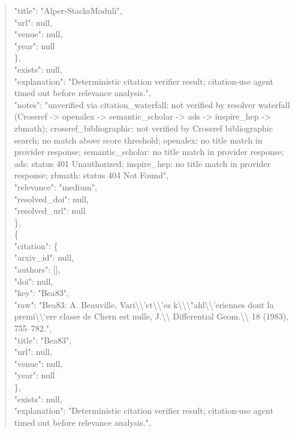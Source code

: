 \documentclass[11pt]{article}
\begin{document}
\begin{quote}
        "title": "Alper-StacksModuli",\\
        "url": null,\\
        "venue": null,\\
        "year": null\\
      \},\\
      "exists": null,\\
      "explanation": "Deterministic citation verifier result; citation-use agent timed out before relevance analysis.",\\
      "notes": "unverified via citation\_waterfall: not verified by resolver waterfall (Crossref -> openalex -> semantic\_scholar -> ads -> inspire\_hep -> zbmath); crossref\_bibliographic: not verified by Crossref bibliographic search; no match above score threshold; openalex: no title match in provider response; semantic\_scholar: no title match in provider response; ads: status 401 Unauthorized; inspire\_hep: no title match in provider response; zbmath: status 404 Not Found",\\
      "relevance": "medium",\\
      "resolved\_doi": null,\\
      "resolved\_url": null\\
    \},\\
    \{\\
      "citation": \{\\
        "arxiv\_id": null,\\
        "authors": [],\\
        "doi": null,\\
        "key": "Bea83",\\
        "raw": "Bea83: A. Beauville, Vari\textbackslash{}\textbackslash{}'et\textbackslash{}\textbackslash{}'es k\textbackslash{}\textbackslash{}\textbackslash{}"ahl\textbackslash{}\textbackslash{}'eriennes dont la premi\textbackslash{}\textbackslash{}`ere classe de Chern est nulle, J.\textbackslash{}\textbackslash{} Differential Geom.\textbackslash{}\textbackslash{} 18 (1983), 755--782.",\\
        "title": "Bea83",\\
        "url": null,\\
        "venue": null,\\
        "year": null\\
      \},\\
      "exists": null,\\
      "explanation": "Deterministic citation verifier result; citation-use agent timed out before relevance analysis.",\\

\end{quote}
\end{document}
